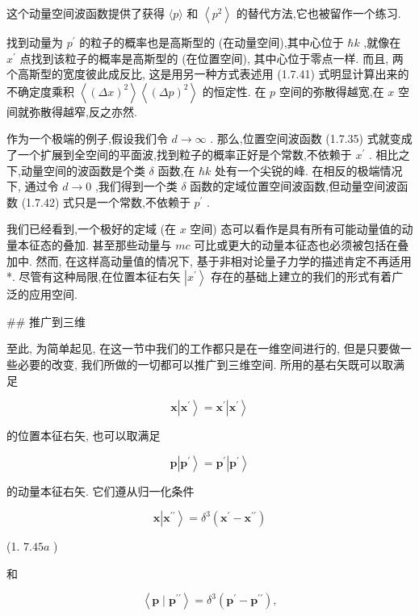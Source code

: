 \documentclass[lang=cn,newtx,10pt,scheme=chinese,thmcnt=section]{elegantbook}
\begin{document}
这个动量空间波函数提供了获得 $\langle p\rangle$ 和 $\left\langle {p}^{2}\right\rangle$ 的替代方法,它也被留作一个练习.

找到动量为 ${p}^{\prime }$ 的粒子的概率也是高斯型的 (在动量空间),其中心位于 $\hbar k$ ,就像在 ${x}^{\prime }$ 点找到该粒子的概率是高斯型的 (在位置空间), 其中心位于零点一样. 而且, 两个高斯型的宽度彼此成反比, 这是用另一种方式表述用 (1.7.41) 式明显计算出来的不确定度乘积 $\left\langle {\left( \Delta x\right) }^{2}\right\rangle \left\langle {\left( \Delta p\right) }^{2}\right\rangle$ 的恒定性. 在 $p$ 空间的弥散得越宽,在 $x$ 空间就弥散得越窄,反之亦然.

作为一个极端的例子,假设我们令 $d \rightarrow \infty$ . 那么,位置空间波函数 (1.7.35) 式就变成了一个扩展到全空间的平面波,找到粒子的概率正好是个常数,不依赖于 ${x}^{\prime }$ . 相比之下,动量空间的波函数是个类 $\delta$ 函数,在 $\hbar k$ 处有一个尖锐的峰. 在相反的极端情况下, 通过令 $d \rightarrow 0$ ,我们得到一个类 $\delta$ 函数的定域位置空间波函数,但动量空间波函数 (1.7.42) 式只是一个常数,不依赖于 ${p}^{\prime }$ .

我们已经看到,一个极好的定域 (在 $x$ 空间) 态可以看作是具有所有可能动量值的动量本征态的叠加. 甚至那些动量与 ${mc}$ 可比或更大的动量本征态也必须被包括在叠加中. 然而, 在这样高动量值的情况下, 基于非相对论量子力学的描述肯定不再适用*. 尽管有这种局限,在位置本征右矢 $\left| {x}^{\prime }\right\rangle$ 存在的基础上建立的我们的形式有着广泛的应用空间.

## 推广到三维

至此, 为简单起见, 在这一节中我们的工作都只是在一维空间进行的, 但是只要做一些必要的改变, 我们所做的一切都可以推广到三维空间. 所用的基右矢既可以取满足

$$
\mathbf{x}\left| {\mathbf{x}}^{\prime }\right\rangle = {\mathbf{x}}^{\prime }\left| {\mathbf{x}}^{\prime }\right\rangle \tag{1. 7.43}
$$

的位置本征右矢, 也可以取满足

$$
\mathbf{p}\left| {\mathbf{p}}^{\prime }\right\rangle = {\mathbf{p}}^{\prime }\left| {\mathbf{p}}^{\prime }\right\rangle \tag{1.7.44}
$$

的动量本征右矢. 它们遵从归一化条件

$$
\mathbf{x}\left| {\mathbf{x}}^{\prime \prime }\right\rangle = {\delta }^{3}\left( {{\mathbf{x}}^{\prime } - {\mathbf{x}}^{\prime \prime }}\right)
$$

(1. ${7.45a}$ )

和

$$
\left\langle {\mathbf{p} \mid {\mathbf{p}}^{\prime \prime }}\right\rangle = {\delta }^{3}\left( {{\mathbf{p}}^{\prime } - {\mathbf{p}}^{\prime \prime }}\right) ,
$$
\end{document}
